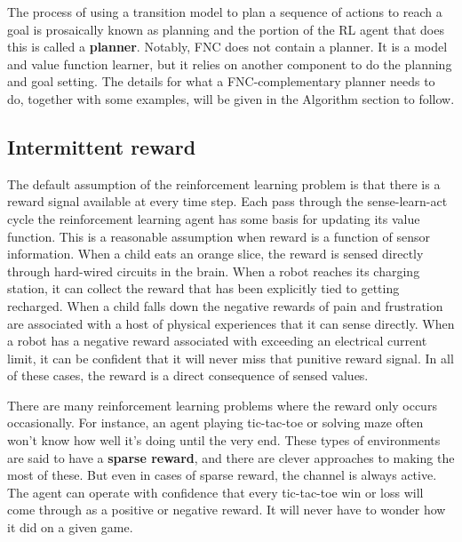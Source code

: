The process of using a transition model to plan a sequence of actions
to reach a goal is prosaically known as planning and the portion of
the RL agent that does this is called a \textbf{planner}.
Notably, FNC does not contain a planner. It is a model
and value function learner, but it relies on another component to do
the planning and goal setting. The details for what a FNC-complementary
planner needs to do, together with some examples, will be given in
the Algorithm section to follow. 

\subsection{Intermittent reward}
\label{subsec:introintermittent}

The default assumption of the reinforcement learning problem is that there is
a reward signal available at every time step. Each pass through the sense-learn-act
cycle the reinforcement learning agent has some basis for updating its
value function. This is a reasonable assumption when reward is a function of
sensor information. When a child eats an orange slice, the reward is sensed directly
through hard-wired circuits in the brain.
When a robot reaches its charging station, it can collect the reward that has
been explicitly tied to getting recharged. When a child falls down the negative
rewards of pain and frustration are associated with a host of physical experiences
that it can sense directly. When a robot has a negative reward associated with
exceeding an electrical current limit, it can be confident that it will never
miss that punitive reward signal. In all of these cases, the reward
is a direct consequence of sensed values.

There are many reinforcement learning problems where the reward only occurs
occasionally. For instance, an agent playing tic-tac-toe or solving maze often
won’t know how well it’s doing until the very end. These types of environments are
said to have a \textbf{sparse reward}, and there are clever approaches to making the
most of these. But even in cases of sparse reward, the channel is always active.
The agent can operate with confidence that every tic-tac-toe win or loss will
come through as a positive or negative reward.  It will never have to wonder how it
did on a given game.

